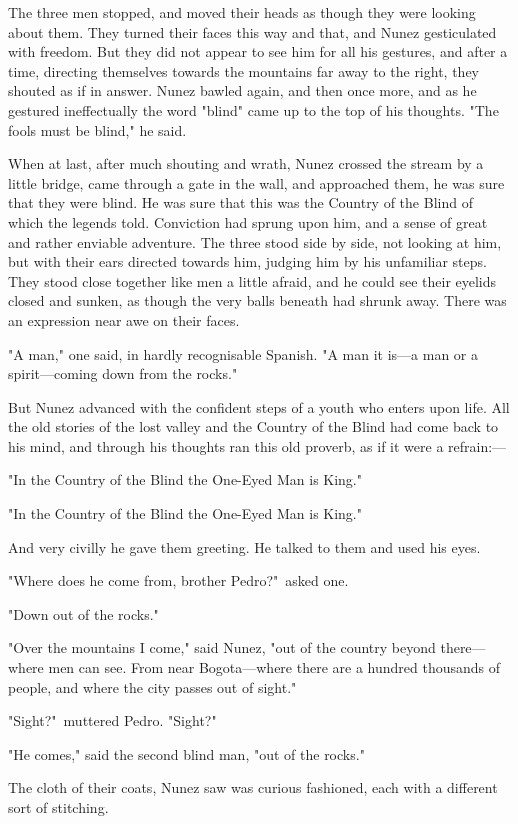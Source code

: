 \documentclass[courier]{sffms}
\begin{document}
The three men stopped, and moved their heads as though they were
looking about them. They turned their faces this way and that, and
Nunez gesticulated with freedom. But they did not appear to see him
for all his gestures, and after a time, directing themselves towards
the mountains far away to the right, they shouted as if in
answer. Nunez bawled again, and then once more, and as he gestured
ineffectually the word "blind" came up to the top of his
thoughts. "The fools must be blind," he said.

When at last, after much shouting and wrath, Nunez crossed the stream
by a little bridge, came through a gate in the wall, and approached
them, he was sure that they were blind. He was sure that this was the
Country of the Blind of which the legends told. Conviction had sprung
upon him, and a sense of great and rather enviable adventure. The
three stood side by side, not looking at him, but with their ears
directed towards him, judging him by his unfamiliar steps. They stood
close together like men a little afraid, and he could see their
eyelids closed and sunken, as though the very balls beneath had shrunk
away. There was an expression near awe on their faces.

"A man," one said, in hardly recognisable Spanish. "A man it is---a man
or a spirit---coming down from the rocks."

But Nunez advanced with the confident steps of a youth who enters upon
life. All the old stories of the lost valley and the Country of the
Blind had come back to his mind, and through his thoughts ran this old
proverb, as if it were a refrain:---

"In the Country of the Blind the One-Eyed Man is King."

"In the Country of the Blind the One-Eyed Man is King."

And very civilly he gave them greeting. He talked to them and used his
eyes.

"Where does he come from, brother Pedro?"\ asked one.

"Down out of the rocks."

"Over the mountains I come," said Nunez, "out of the country beyond
there---where men can see. From near Bogota---where there are a hundred
thousands of people, and where the city passes out of sight."

"Sight?"\ muttered Pedro. "Sight?"

"He comes," said the second blind man, "out of the rocks."

The cloth of their coats, Nunez saw was curious fashioned, each with a
different sort of stitching.
\end{document}
